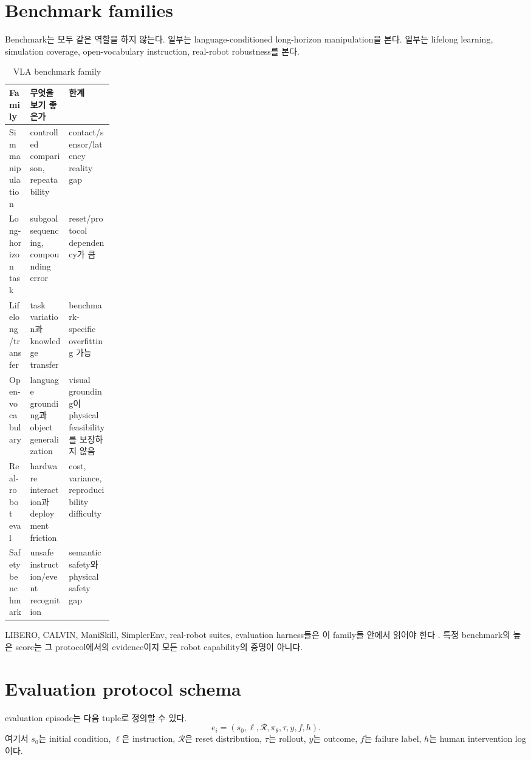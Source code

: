 \section{Benchmark families}

Benchmark는 모두 같은 역할을 하지 않는다. 일부는 language-conditioned long-horizon manipulation을 본다. 일부는 lifelong learning, simulation coverage, open-vocabulary instruction, real-robot robustness를 본다.

\begin{table}[h]
  \centering
  \caption{VLA benchmark family}
  \begin{tabularx}{\linewidth}{p{0.2\linewidth}X X}
    \toprule
    Family & 무엇을 보기 좋은가 & 한계 \\
    \midrule
    Sim manipulation & controlled comparison, repeatability & contact/sensor/latency reality gap \\
    Long-horizon task & subgoal sequencing, compounding error & reset/protocol dependency가 큼 \\
    Lifelong/transfer & task variation과 knowledge transfer & benchmark-specific overfitting 가능 \\
    Open-vocabulary & language grounding과 object generalization & visual grounding이 physical feasibility를 보장하지 않음 \\
    Real-robot eval & hardware interaction과 deployment friction & cost, variance, reproducibility difficulty \\
    Safety benchmark & unsafe instruction/event recognition & semantic safety와 physical safety gap \\
    \bottomrule
  \end{tabularx}
  \label{tab:ch16-benchmark-family}
\end{table}

LIBERO, CALVIN, ManiSkill, SimplerEnv, real-robot suites, evaluation harness들은 이 family들 안에서 읽어야 한다 \cite{libero2023,calvin2022,maniskill22023,simplerenv2024}. 특정 benchmark의 높은 score는 그 protocol에서의 evidence이지 모든 robot capability의 증명이 아니다.

\section{Evaluation protocol schema}

evaluation episode는 다음 tuple로 정의할 수 있다.
\begin{equation}
  e_i
  =
  (
  s_0,
  \ell,
  \mathcal{R},
  \pi_{\theta},
  \tau,
  y,
  f,
  h
  ).
  \label{eq:ch16-episode-schema}
\end{equation}
여기서 $s_0$는 initial condition, $\ell$은 instruction, $\mathcal{R}$은 reset distribution, $\tau$는 rollout, $y$는 outcome, $f$는 failure label, $h$는 human intervention log이다.

